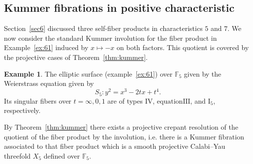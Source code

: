 \documentclass[a4paper]{amsart}
\theoremstyle{plain}
\theoremstyle{definition}
\newtheorem{Exm}[Thm]{Example}
\theoremstyle{remark}
\numberwithin{equation}{section}
\newcommand{\FF}{\mathbb{F}}
\begin{document}
\subsection{Kummer fibrations in positive characteristic}
\label{sec10}

Section~\ref{sec6} discussed three self-fiber products in characteristics
$5$ and $7$.  We now consider the standard Kummer involution for the fiber product in Example~\ref{ex:61} induced by
$x\mapsto-x$ on both factors.  This quotient is covered by the
projective cases of Theorem~\ref{thm:kummer}.
%
%
\begin{Exm}
The elliptic surface (example~\ref{ex:61}) over $\FF_5$ given by the Weierstrass equation  %
given by
\[
S_5\colon y^2=x^3-2tx+t^4.
\]
Its singular fibers over $t=\infty,0,1$ are of types
$\mathrm{IV}$, $\mathrm{equationIII}$, and
$\mathrm{I}_5$, respectively.

By Theorem~\ref{thm:kummer} there exists a projective crepant resolution of the quotient of the fiber product by the involution, i.e. there is
a Kummer fibration associated to that fiber product which is a smooth projective Calabi--Yau threefold $X_{5}$ defined over $\FF_{5}$.

\end{Exm}
%
%
%
\end{document}
